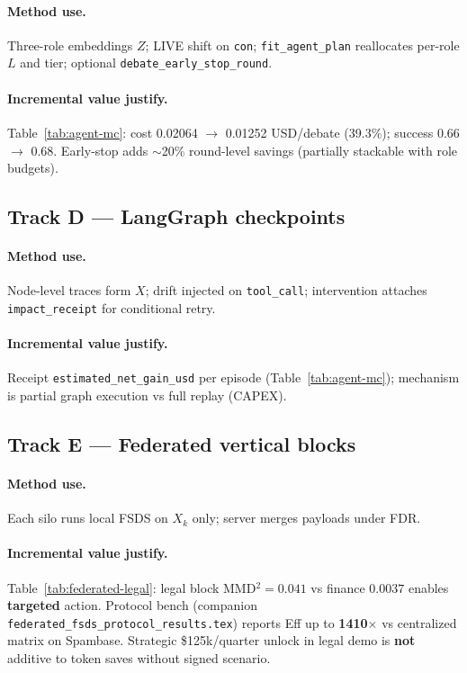 \documentclass[11pt]{article}
\begin{document}
\paragraph{Method use.}
Three-role embeddings $Z$; LIVE shift on \texttt{con}; \texttt{fit\_agent\_plan} reallocates per-role $L$ and tier; optional \texttt{debate\_early\_stop\_round}.

\paragraph{Incremental value justify.}
Table~\ref{tab:agent-mc}: cost 0.02064 $\rightarrow$ 0.01252 USD/debate (39.3\%); success 0.66 $\rightarrow$ 0.68.
Early-stop adds $\sim$20\% round-level savings (partially stackable with role budgets).

\subsection{Track D --- LangGraph checkpoints}

\paragraph{Method use.}
Node-level traces form $X$; drift injected on \texttt{tool\_call}; intervention attaches \texttt{impact\_receipt} for conditional retry.

\paragraph{Incremental value justify.}
Receipt \texttt{estimated\_net\_gain\_usd} per episode (Table~\ref{tab:agent-mc}); mechanism is partial graph execution vs full replay (CAPEX).

\subsection{Track E --- Federated vertical blocks}

\paragraph{Method use.}
Each silo runs local FSDS on $X_k$ only; server merges payloads under FDR.

\paragraph{Incremental value justify.}
Table~\ref{tab:federated-legal}: legal block MMD$^2=0.041$ vs finance $0.0037$ enables \textbf{targeted} action.
Protocol bench (companion \texttt{federated\_fsds\_protocol\_results.tex}) reports Eff up to \textbf{1410$\times$} vs centralized matrix on Spambase.
Strategic \$125k/quarter unlock in legal demo is \textbf{not} additive to token saves without signed scenario.
\end{document}
